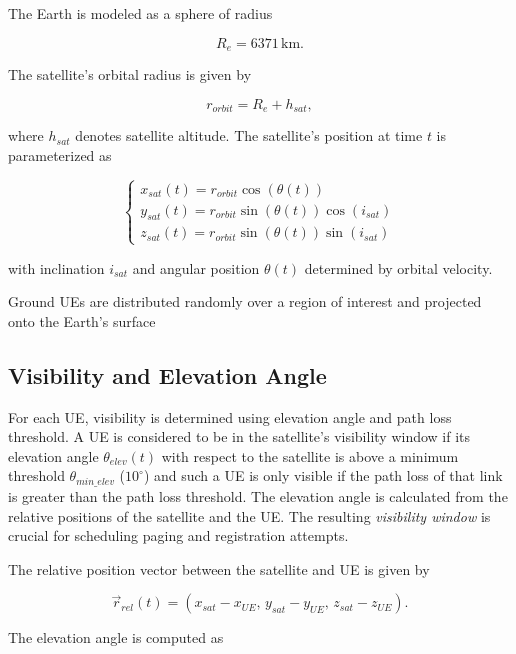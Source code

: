 \documentclass[conference]{IEEEtran}
\begin{document}
 The Earth is modeled as a sphere of radius

\begin{equation}
R_e = 6371 \,\text{km}.
\end{equation}

The satellite's orbital radius is given by

\begin{equation}
r_{orbit} = R_e + h_{sat},
\end{equation}

where $h_{sat}$ denotes satellite altitude. The satellite's position at time $t$ is parameterized as

\begin{equation}
\begin{cases}
x_{sat}(t) = r_{orbit} \cos(\theta(t)) \\
y_{sat}(t) = r_{orbit} \sin(\theta(t)) \cos(i_{sat}) \\
z_{sat}(t) = r_{orbit} \sin(\theta(t)) \sin(i_{sat})
\end{cases}
\end{equation}

with inclination $i_{sat}$ and angular position $\theta(t)$ determined by orbital velocity.

Ground UEs are distributed randomly over a region of interest and projected onto the Earth's surface

\subsection{Visibility and Elevation Angle}
For each UE, visibility is determined using elevation angle and path loss threshold.
A UE is considered to be in the satellite's visibility window if its elevation angle $\theta_{elev}(t)$ with respect to the satellite is above a minimum threshold $\theta_{min\_elev}$ ($10^\circ$) and such a UE is only visible if the path loss of that link is greater than the path loss threshold.
The elevation angle is calculated from the relative positions of the satellite and the UE. The resulting \textit{visibility window} is crucial for scheduling paging and registration attempts.


The relative position vector between the satellite and UE is given by

\begin{equation}
\vec{r}_{rel}(t) = (x_{sat}-x_{UE},\, y_{sat}-y_{UE},\, z_{sat}-z_{UE}).
\end{equation}

The elevation angle is computed as
\end{document}
